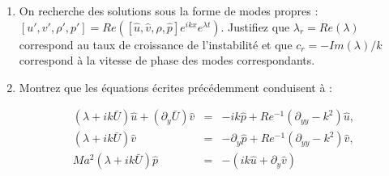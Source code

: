 \documentclass[a4paper,11pt]{article}
\begin{document}
\begin{enumerate}
\item On recherche des solutions sous la forme de modes propres : 
$[u',v',\rho',p'] = Re \left( [\hat{u},\hat{v},\hat{\rho},\hat{p}] e^{i k x} e^{\lambda t} \right)$. 
Justifiez que $\lambda_r = Re(\lambda)$ correspond au taux de croissance de l'instabilité et que $c_r = - Im(\lambda)/k$ 
correspond à la vitesse de phase des modes correspondants.




\item 
Montrez que les équations écrites précédemment conduisent à :


\begin{eqnarray}
(\lambda +i k \bar{U}) \hat{u} + (\partial_y \bar{U}) \hat{v} &=&   - i k \hat{p} + Re^{-1} ( \partial_{yy} - k^2) \hat{u}, 
\\
(\lambda + i k \bar{U}) \hat{v} &=& - \partial_y \hat{p} + Re^{-1}  ( \partial_{yy} - k^2) \hat{v}, 
\\
Ma^2 (\lambda + i k \bar{U})  \hat{p} &=&  - (i k  \hat{u} + \partial_y \hat{v})
\end{eqnarray}






\end{enumerate}
\end{document}
